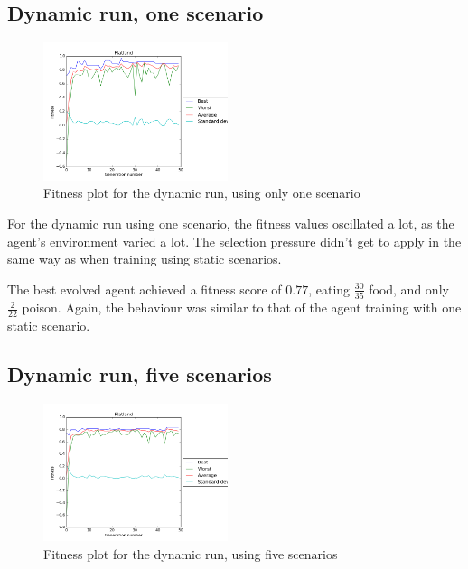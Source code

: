 \documentclass[
]{article}
\begin{document}
\subsection{Dynamic run, one scenario}

\begin{figure}
  \begin{center}
    \includegraphics[width=0.48\textwidth]{dynamic_one.png}
  \end{center}
  \caption{Fitness plot for the dynamic run, using only one scenario}
  \label{fig:dynamic_one}
\end{figure}

For the dynamic run using one scenario, the fitness values oscillated a lot, as the agent's environment varied a lot. The selection pressure didn't get to apply in the same way as when training using static scenarios.

The best evolved agent achieved a fitness score of $0.77$, eating $\frac{30}{35}$ food, and only $\frac{2}{22}$ poison. Again, the behaviour was similar to that of the agent training with one static scenario.

\subsection{Dynamic run, five scenarios}

\begin{figure}
  \begin{center}
    \includegraphics[width=0.48\textwidth]{dynamic_five.png}
  \end{center}
  \caption{Fitness plot for the dynamic run, using five scenarios}
  \label{fig:dynamic_five}
\end{figure}
\end{document}
